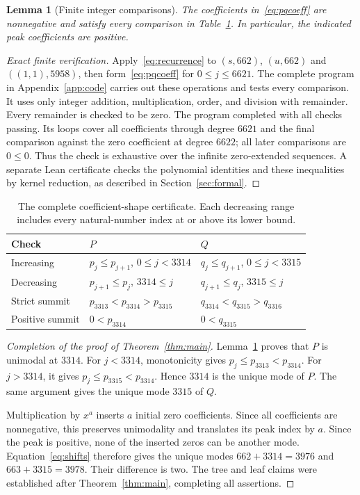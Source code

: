 \documentclass[11pt]{article}
\newtheorem{lemma}[theorem]{Lemma}
\begin{document}
\begin{lemma}[Finite integer comparisons]\label{lem:finite}
The coefficients in~\eqref{eq:pqcoeff} are nonnegative and satisfy every comparison in Table~\ref{tab:certificate}. In particular, the indicated peak coefficients are positive.
\end{lemma}
\begin{proof}[Exact finite verification]
Apply~\eqref{eq:recurrence} to $(s,662)$, $(u,662)$ and $((1,1),5958)$, then form~\eqref{eq:pqcoeff} for $0\le j\le6621$. The complete program in Appendix~\ref{app:code} carries out these operations and tests every comparison. It uses only integer addition, multiplication, order, and division with remainder. Every remainder is checked to be zero. The program completed with all checks passing. Its loops cover all coefficients through degree $6621$ and the final comparison against the zero coefficient at degree $6622$; all later comparisons are $0\le0$. Thus the check is exhaustive over the infinite zero-extended sequences. A separate Lean certificate checks the polynomial identities and these inequalities by kernel reduction, as described in Section~\ref{sec:formal}.
\end{proof}

\begin{table}[ht]
\centering
\begin{tabular}{@{}lll@{}}
\toprule
Check & $P$ & $Q$\\\midrule
Increasing & $p_j\le p_{j+1}$, $0\le j<3314$ & $q_j\le q_{j+1}$, $0\le j<3315$\\
Decreasing & $p_{j+1}\le p_j$, $3314\le j$ & $q_{j+1}\le q_j$, $3315\le j$\\
Strict summit & $p_{3313}<p_{3314}>p_{3315}$ & $q_{3314}<q_{3315}>q_{3316}$\\
Positive summit & $0<p_{3314}$ & $0<q_{3315}$\\\bottomrule
\end{tabular}
\caption{The complete coefficient-shape certificate. Each decreasing range includes every natural-number index at or above its lower bound.}\label{tab:certificate}
\end{table}

\begin{proof}[Completion of the proof of Theorem~\ref{thm:main}]
Lemma~\ref{lem:finite} proves that $P$ is unimodal at $3314$. For $j<3314$, monotonicity gives $p_j\le p_{3313}<p_{3314}$. For $j>3314$, it gives $p_j\le p_{3315}<p_{3314}$. Hence $3314$ is the unique mode of $P$. The same argument gives the unique mode $3315$ of $Q$.

Multiplication by $x^a$ inserts $a$ initial zero coefficients. Since all coefficients are nonnegative, this preserves unimodality and translates its peak index by $a$. Since the peak is positive, none of the inserted zeros can be another mode. Equation~\eqref{eq:shifts} therefore gives the unique modes $662+3314=3976$ and $663+3315=3978$. Their difference is two. The tree and leaf claims were established after Theorem~\ref{thm:main}, completing all assertions.
\end{proof}
\end{document}
